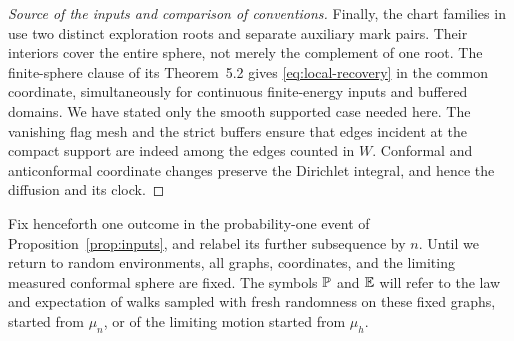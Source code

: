 \begin{proof}[Source of the inputs and comparison of conventions]
Finally, the chart families in \cite[Proposition~2.4(iv)]{SC} use two
distinct exploration roots and separate auxiliary mark pairs.  Their
interiors cover the entire sphere, not merely the complement of one root.
The finite-sphere clause of its Theorem~5.2 gives
\eqref{eq:local-recovery} in the common coordinate, simultaneously for
continuous finite-energy inputs and buffered domains.  We have stated
only the smooth supported case needed here.  The vanishing flag mesh and
the strict buffers ensure that edges incident at the compact support are
indeed among the edges counted in \(W\).  Conformal and anticonformal
coordinate changes preserve the Dirichlet integral, and hence the
diffusion and its clock.
\end{proof}

Fix henceforth one outcome in the probability-one event of
Proposition~\ref{prop:inputs}, and relabel its further subsequence by
\(n\).  Until we return to random environments, all graphs, coordinates,
and the limiting measured conformal sphere are fixed.  The symbols
\(\mathbb P\) and \(\mathbb E\) will refer to the law and expectation of walks
sampled with fresh randomness on these fixed graphs, started from
\(\mu_n\), or of the limiting motion started from \(\mu_h\).
